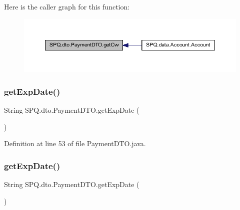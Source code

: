 Here is the caller graph for this function\+:\nopagebreak
\begin{figure}[H]
\begin{center}
\leavevmode
\includegraphics[width=350pt]{class_s_p_q_1_1dto_1_1_payment_d_t_o_a64fb9df59333fcc2a0c8bea48024354d_icgraph}
\end{center}
\end{figure}
\mbox{\label{class_s_p_q_1_1dto_1_1_payment_d_t_o_aa91402a8c96a306fcf125973e4f35912}} 
\subsubsection{\texorpdfstring{get\+Exp\+Date()}{getExpDate()}\hspace{0.1cm}{\footnotesize\ttfamily [1/3]}}
{\footnotesize\ttfamily String S\+P\+Q.\+dto.\+Payment\+D\+T\+O.\+get\+Exp\+Date (\begin{DoxyParamCaption}{ }\end{DoxyParamCaption})}



Definition at line 53 of file Payment\+D\+T\+O.\+java.

\mbox{\label{class_s_p_q_1_1dto_1_1_payment_d_t_o_aa91402a8c96a306fcf125973e4f35912}} 
\subsubsection{\texorpdfstring{get\+Exp\+Date()}{getExpDate()}\hspace{0.1cm}{\footnotesize\ttfamily [2/3]}}
{\footnotesize\ttfamily String S\+P\+Q.\+dto.\+Payment\+D\+T\+O.\+get\+Exp\+Date (\begin{DoxyParamCaption}{ }\end{DoxyParamCaption})}



